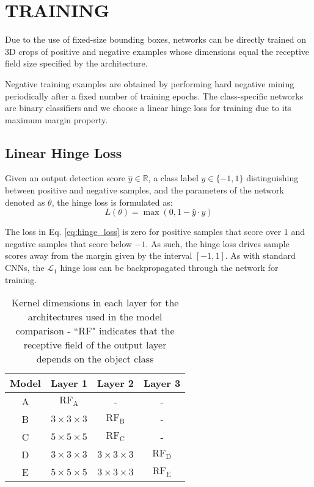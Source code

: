 \documentclass[letterpaper, 10 pt, conference]{tex_style/ieeeconf}
\begin{document}
\section{TRAINING}
\label{sec:training}

Due to the use of fixed-size bounding boxes, networks can be directly trained on 3D crops of positive and negative examples whose dimensions equal the receptive field size specified by the architecture.

Negative training examples are obtained by performing hard negative mining periodically after a fixed number of training epochs.
The class-specific networks are binary classifiers and we choose a linear hinge loss for training due to its maximum margin property.



\subsection{Linear Hinge Loss}
Given an output detection score $\hat{y} \in \mathbb{R}$, a class label $y \in \{ -1, 1 \}$ distinguishing between positive and negative samples, and the parameters of the network denoted as $\theta$, the hinge loss is formulated as:
\begin{equation}
    L \left( \theta \right) = \max \left( 0, 1 - \hat{y} \cdot y \right)
    \label{eq:hinge_loss}
\end{equation}

The loss in Eq. \ref{eq:hinge_loss} is zero for positive samples that score over $1$ and negative samples that score below $-1$.
As such, the hinge loss drives sample scores away from the margin given by the interval $\left[-1,1\right]$.
As with standard CNNs, the $\mathcal{L}_1$ hinge loss can be backpropagated through the network for training.





\begin{table}
    \parbox[t]{\columnwidth}{
    \centering
    \caption{Kernel dimensions in each layer for the architectures used in the model comparison - ``RF" indicates that the receptive field of the output layer depends on the object class}
    \begin{tabularx}{0.32\textwidth}{c c c c}
        \toprule
        Model    & Layer 1   & Layer 2   & Layer 3   \\
        \midrule
        A   & $\mathrm{RF_A}$   & - & - \\
        B   & $3\times3\times3$ & $\mathrm{RF_B}$  & - \\
        C   & $5\times5\times5$ & $\mathrm{RF_C}$  & - \\
        D   & $3\times3\times3$ & $3\times3\times3$ & $\mathrm{RF_D}$  \\
        E   & $5\times5\times5$ & $3\times3\times3$ & $\mathrm{RF_E}$  \\
        \bottomrule
    \end{tabularx}
    \label{tab:architectures}}
\end{table}
\end{document}
